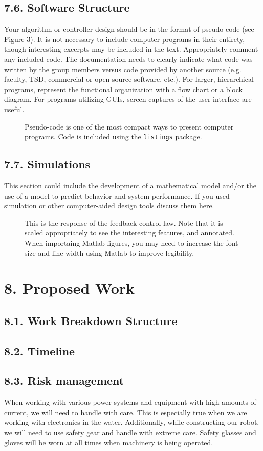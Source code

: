 \documentclass[10pt]{article}
\begin{document}
\subsection{7.6. Software Structure}
Your algorithm or controller design should be in the format of pseudo-code (see Figure 3). It is not necessary to include computer programs in their entirety, though interesting excerpts may be included in the text. Appropriately comment any included code. The documentation needs to clearly indicate what code was written by the group members versus code provided by another source (e.g. faculty, TSD, commercial or open-source software, etc.).  For larger, hierarchical programs, represent the functional organization with a flow chart or a block diagram.  For programs utilizing GUIs, screen captures of the user interface are useful.   
\begin{figure}
\caption{Pseudo-code is one of the most compact ways to present computer programs. Code is included using the \texttt{listings} package.}
\label{fig:3}
\end{figure} 

\subsection{7.7. Simulations}
This section could include the development of a mathematical model and/or the use of a model to predict behavior and system performance.  If you used simulation or other computer-aided design tools discuss them here. 
\begin{figure}
\caption{This is the response of the feedback control law.   Note that it is scaled appropriately to see the interesting features, and annotated.   When importaing Matlab figures, you may need to increase the font size and line width using Matlab to improve legibility.}
\label{fig:5} %
\end{figure}

\section{8. Proposed Work}
\subsection{8.1. Work Breakdown Structure}
\subsection{8.2. Timeline}
\subsection{8.3. Risk management}
When working with various power systems and equipment with high amounts of current, we will need to handle with care. This is especially true when we are working with electronics in the water. Additionally, while constructing our robot, we will need to use safety gear and handle with extreme care. Safety glasses and gloves will be worn at all times when machinery is being operated. 
\end{document}
